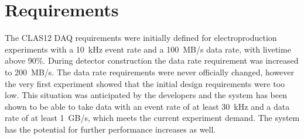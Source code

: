 \section{Requirements}

The CLAS12 DAQ requirements were initially defined for electroproduction experiments with a 10~kHz event rate
and a 100~MB/s data rate, with livetime above 90\%. During detector construction the data rate requirement was
increased to 200~MB/s. The data rate requirements were never officially changed, however the very first experiment
showed that the initial design requirements were too low. This situation was anticipated by the developers and the
system has been shown to be able to take data with an event rate of at least 30~kHz and a data rate of at least 1~GB/s,
which meets the current experiment demand. The system has the potential for further performance increases as well.

